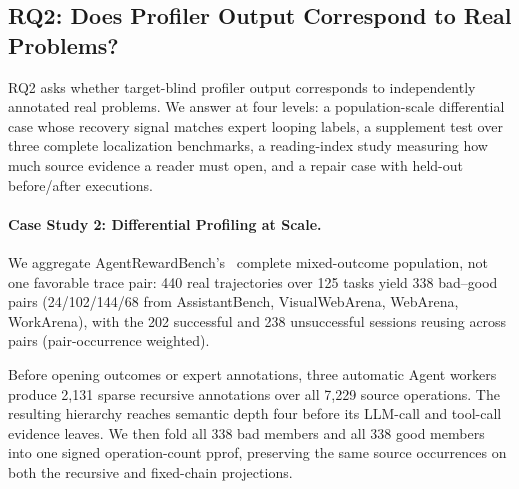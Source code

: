 \documentclass[letterpaper]{article}
\begin{document}

\subsection{RQ2: Does Profiler Output Correspond to Real Problems?}

RQ2 asks whether target-blind profiler output corresponds to independently
annotated real problems. We answer at four levels: a population-scale
differential case whose recovery signal matches expert looping labels, a
supplement test over three complete localization benchmarks, a reading-index
study measuring how much source evidence a reader must open, and a repair case
with held-out before/after executions.

\paragraph{Case Study 2: Differential Profiling at Scale.}

We aggregate AgentRewardBench's~\cite{agentrewardbench} complete mixed-outcome population,
not one favorable trace pair: 440 real trajectories over 125 tasks yield 338 bad--good
pairs (24/102/144/68 from AssistantBench, VisualWebArena, WebArena, WorkArena), with the
202 successful and 238 unsuccessful sessions reusing across pairs (pair-occurrence weighted).

Before opening outcomes or expert annotations, three automatic Agent workers
produce 2{,}131 sparse recursive annotations over all 7{,}229 source
operations. The resulting hierarchy reaches semantic depth four before its
LLM-call and tool-call evidence leaves. We then fold all 338 bad members and
all 338 good members into one signed operation-count pprof, preserving the same
source occurrences on both the recursive and fixed-chain projections.
\end{document}
